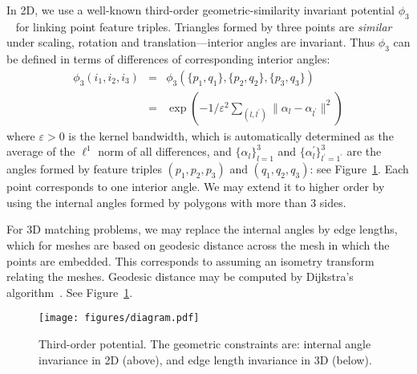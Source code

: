 In 2D, we use a well-known third-order geometric-similarity invariant potential $\phi_3$~\cite{Duchenne09,Duchenne2011,Chertok10} for linking point feature triples.
Triangles formed by three points are \emph{similar} under scaling, rotation and translation---interior angles are invariant.
Thus $\phi_3$ can be defined in terms of differences of corresponding interior angles:
\begin{eqnarray}
\phi_3(i_1,i_2,i_3)&=&\phi_3(\{p_1,q_1\}, \{p_2,q_2\}, \{p_3,q_3\})\nonumber\\
&=&\exp(-1/\varepsilon^2\sum\nolimits_{(l,l^{'})}\lVert \alpha_l- \alpha_{l^{'} } \lVert^2 )
\end{eqnarray}
where $\varepsilon > 0$ is the kernel bandwidth, which is automatically determined as the average of the $\mathcal{\ell}^1$ norm of all differences,
and $\{\alpha_l\}_{l=1}^3$ and $\{\alpha_l^{'}\}_{l^{'}=1^{'}}^{3}$ are the angles formed by feature triples $(p_1,p_2,p_3)$ and $(q_1,q_2,q_3)$:
see Figure~\ref{fig:TO}. Each point corresponds to one interior angle.
We may extend it to higher order by using the internal angles formed by polygons with more than 3 sides.

For 3D matching problems, we may replace the internal angles by edge lengths, which for meshes are based on geodesic distance across the mesh in which the points are embedded. This corresponds to assuming an isometry transform relating the meshes.
Geodesic distance may be computed by Dijkstra's algorithm~\cite{Peyre2010}.
See  Figure~\ref{fig:TO}.

\begin{figure}
\centering
  \texttt{[image: figures/diagram.pdf]}
  \caption{Third-order potential. The geometric constraints are: internal angle invariance in 2D (above), and edge length invariance in 3D (below).}
\label{fig:TO}
\end{figure}

